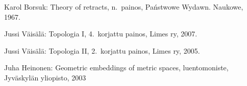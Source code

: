\documentclass[12pt,a4paper,leqno]{report}
\theoremstyle{plain}
\theoremstyle{definition}
\theoremstyle{remark}
\begin{document}


\begin{thebibliography}{9}

Karol Borsuk: Theory of retracts, n.\ painos, Państwowe Wydawn. Naukowe, 1967.

Jussi Väisälä: Topologia I, 4.\ korjattu painos, Limes ry, 2007.

Jussi Väisälä: Topologia II, 2.\ korjattu painos, Limes ry, 2005.

Juha Heinonen: Geometric embeddings of metric spaces, luentomoniste, Jyväskylän yliopisto, 2003


\end{thebibliography}
\end{document}
